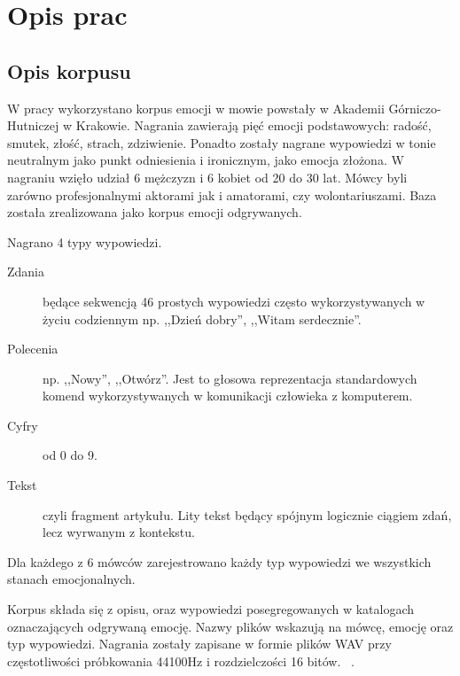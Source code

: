 \documentclass[a4paper,12pt,twoside,openany]{report}
\begin{document}
\chapter{Opis prac}
\section{Opis korpusu}
W pracy wykorzystano korpus emocji w mowie powstały w Akademii Górniczo-Hutniczej w Krakowie.
Nagrania zawierają pięć emocji podstawowych: radość, smutek, złość, strach, zdziwienie.
Ponadto zostały nagrane wypowiedzi w tonie neutralnym jako punkt odniesienia i ironicznym, jako emocja złożona.
W nagraniu wzięło udział 6 mężczyzn i 6 kobiet od 20 do 30 lat. 
Mówcy byli zarówno profesjonalnymi aktorami jak i amatorami, czy wolontariuszami.
Baza została zrealizowana jako korpus emocji odgrywanych. 

Nagrano 4 typy wypowiedzi.
\begin{description}
	\item [Zdania] będące sekwencją 46 prostych wypowiedzi często wykorzystywanych w życiu codziennym 
		np. ,,Dzień dobry'', ,,Witam serdecznie''. 
	\item [Polecenia]  np. ,,Nowy'', ,,Otwórz''. 
		Jest to głosowa reprezentacja standardowych komend wykorzystywanych w komunikacji człowieka z komputerem.
	\item [Cyfry] od 0 do 9.
	\item [Tekst] czyli fragment artykułu. 
		Lity tekst będący spójnym logicznie ciągiem zdań, lecz wyrwanym z kontekstu.
\end{description}
Dla każdego z 6 mówców zarejestrowano każdy typ wypowiedzi we wszystkich stanach emocjonalnych.

Korpus składa się z opisu, oraz wypowiedzi posegregowanych w katalogach oznaczających odgrywaną emocję.
Nazwy plików wskazują na mówcę, emocję oraz typ wypowiedzi.
Nagrania zostały zapisane w formie plików WAV przy częstotliwości próbkowania 44100Hz i rozdzielczości 16 bitów. ~\cite{Igras2009}.
\end{document}
